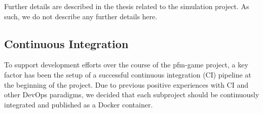 Further details are described in the thesis related to the simulation project. As such, we do not describe any further details here.


\subsection{Continuous Integration}

To support development efforts over the course of the pfm-game project, a key factor has been the setup of a successful continuous integration (CI) pipeline at the beginning of the project. Due to previous positive experiences with CI and other DevOps paradigms, we decided that each subproject should be continuously integrated and published as a Docker container.
